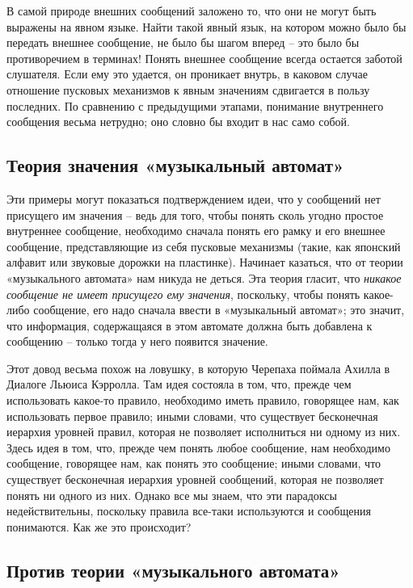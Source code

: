 \documentclass[../main.tex]{subfiles}
\begin{document}
В самой природе внешних сообщений заложено то, что они не могут быть выражены на явном языке. Найти такой явный язык, на котором можно было бы передать внешнее сообщение, не было бы шагом вперед \--- это было бы противоречием в терминах! Понять внешнее сообщение всегда остается заботой слушателя. Если ему это удается, он проникает внутрь, в каковом случае отношение пусковых механизмов к явным значениям сдвигается в пользу последних. По сравнению с предыдущими этапами, понимание внутреннего сообщения весьма нетрудно; оно словно бы входит в нас само собой.


\subsection{Теория значения «музыкальный автомат»}

Эти примеры могут показаться подтверждением идеи, что у сообщений нет присущего им значения \--- ведь для того, чтобы понять сколь угодно простое внутреннее сообщение, необходимо сначала понять его рамку и его внешнее сообщение, представляющие из себя пусковые механизмы (такие, как японский алфавит или звуковые дорожки на пластинке). Начинает казаться, что от теории «музыкального автомата» нам никуда не деться. Эта теория гласит, что \emph{никакое сообщение не имеет присущего ему значения}, поскольку, чтобы понять какое-либо сообщение, его надо сначала ввести в «музыкальный автомат»; это значит, что информация, содержащаяся в этом автомате должна быть добавлена к сообщению \--- только тогда у него появится значение.

Этот довод весьма похож на ловушку, в которую Черепаха поймала Ахилла в Диалоге Льюиса Кэрролла. Там идея состояла в том, что, прежде чем использовать какое-то правило, необходимо иметь правило, говорящее нам, как использовать первое правило; иными словами, что существует бесконечная иерархия уровней правил, которая не позволяет исполниться ни одному из них. Здесь идея в том, что, прежде чем понять любое сообщение, нам необходимо сообщение, говорящее нам, как понять это сообщение; иными словами, что существует бесконечная иерархия уровней сообщений, которая не позволяет понять ни одного из них. Однако все мы знаем, что эти парадоксы недействительны, поскольку правила все-таки используются и сообщения понимаются. Как же это происходит?


\subsection{Против теории «музыкального автомата»}
\end{document}

